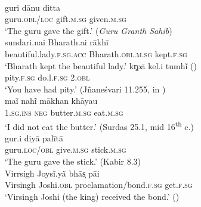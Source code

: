 \documentclass[output=paper]{langsci/langscibook}
\begin{document}
\ea
\label{ex:montaut:5}
\ea 
{}\\
\gll guri  dānu ditta\\
guru.\textsc{obl/loc}    gift.\textsc{m.sg}    given.\textsc{m.sg}    \\    
\glt ‘The guru gave the gift.’ (\textit{Guru Granth Sahib})
\ex 
{}\\
\gll sundari.nai  Bharath.ai           rākhī\\
beautiful.lady.\textsc{f.sg.acc}   Bharath.\textsc{obl.m.sg} kept.\textsc{f.sg} \\ 
\glt ‘Bharath kept the beautiful lady.’ \citep[167]{Tessitori19141916}
\ex 
\gll kr̥pā  kel.i  tumhĩ  () \\
pity.\textsc{f.sg}   do.l.\textsc{f.sg}     \textsc{2.obl} \\
\glt ‘You have had pity.’ (Jñaneśvari 11.255, in \citealt[261]{Bloch1970[1920]})
\ex 
{}\\
\gll maĩ   nahĩ    mākhan          khāyau\\
      \textsc{1.sg.ins}   \textsc{neg}  butter.\textsc{m.sg}   eat.\textsc{m.sg}  \\    
\glt  ‘I did not eat the butter.’ (Surdas 25.1, mid 16\textsuperscript{th} c.)
\ex 
{}\\
\gll   gur.i   diyā   palītā\\
guru.\textsc{loc/obl} give.\textsc{m.sg}   stick.\textsc{m.sg} \\   
\glt ‘The guru gave the stick.’ (Kabir 8.3)
\ex 
{}\\
\gll Virrsigh Joysĩ.yã  bhās̩               pāi\\
Virsingh Joshi.\textsc{obl}    proclamation/bond\textsc{.f.sg}   get\textsc{.f.sg} \\
\glt ‘Virsingh Joshi (the king) received the bond.’ (\citealt[283]{Stroński2014}) 
\z 
\z 
\end{document}
